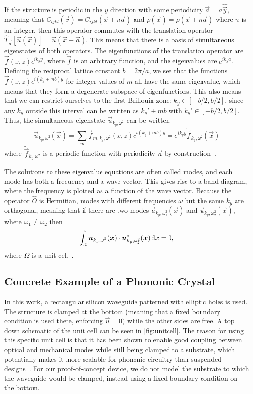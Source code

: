 If the structure is periodic in the $y$ direction with some periodicity
$\vec a = a \hat{\vec y}$,
meaning that $C_{ijkl}(\vec x) = C_{ijkl}(\vec x + n \vec a)$ and $\rho(\vec x)
= \rho(\vec x + n \vec a)$ where $n$ is an
integer, then this operator commutes with the translation operator
$\hat T_{\vec a}[\vec u(\vec x)] = \vec u(\vec x + \vec a)$.
This means that there is a basis of simultaneous eigenstates of both operators.
The eigenfunctions of the translation operator are
$\vec f(x, z)e^{i k_y y}$, where $\vec f$ is an arbitrary function,
and the eigenvalues are $e^{i k_y a}$.
Defining the reciprocal lattice constant $b = 2 \pi / a$, we see
that the functions $\vec f(x, z) e^{i (k_y + m b) y}$ for integer values
of $m$ all have the same eigenvalue, which means that they form a degenerate
subspace of eigenfunctions.
This also means that we can restrict ourselves to the first Brillouin zone:
$k_y \in [-b/2, b/2]$,
since any $k_y$ outside this interval can be written as $k_y' + mb$ with
$k_y' \in [-b/2, b/2]$.
Thus, the simultaneous eigenstate $\vec u_{k_y, \omega^2}$ can be written
\begin{equation}
	\vec u_{k_y, \omega^2}(\vec x) = \sum_m \vec f_{m,k_y,\omega^2}(x, z) e^{i (k_y + m b) y}
	= e^{i k_y y} \tilde{\vec f}_{k_y, \omega^2}(\vec x)
\end{equation}
where $\tilde{\vec f}_{k_y, \omega^2}$ is a periodic function with periodicity
$\vec a$ by construction~\cite{joannopoulos2008photonic}.

The solutions to these eigenvalue equations are often called modes, and each
mode has both a frequency and a wave vector. This gives rise to a band diagram,
where the frequency is plotted as a function of the wave vector.
Because the operator $\hat O$ is Hermitian, modes with different frequencies
$\omega$ but the same $k_y$ are orthogonal, meaning that if there are two modes
$\vec u_{k_y, \omega_1^2}(\vec x)$ and 
$\vec u_{k_y, \omega_2^2}(\vec x)$, where $\omega_1 \neq \omega_2$
then
\begin{equation}
	\int_\Omega \vec u_{k_y, \omega_1^2}(\vec x)
	\cdot\vec u^*_{k_y, \omega_2^2}(\vec x) \dl x = 0,
\end{equation}
where $\Omega$ is a unit cell~\cite{joannopoulos2008photonic}.

\subsection{Concrete Example of a Phononic Crystal}

In this work, a rectangular silicon waveguide patterned with elliptic holes is used.
The structure is clamped at the bottom (meaning that a fixed boundary
condition is used there, enforcing $\vec u = 0$) while the other sides are free.
A top down schematic of the unit cell can be seen in \cref{fig:unitcell}.
The reason for using this specific unit cell is that it has been shown to
enable good coupling between optical and mechanical modes while still being
clamped to a substrate,
which potentially makes it more scalable for phononic circuitry than suspended
designs~\cite{kolvik_clamped_2023}.
For our proof-of-concept device, we do not model the substrate to which the
waveguide would be clamped, instead using a fixed boundary condition on the
bottom.

